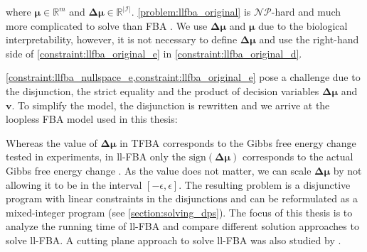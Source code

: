 where $\boldsymbol \mu \in \mathbb{R}^m$ and $\boldsymbol{\Delta \mu} \in \mathbb{R}^{|\mathcal{I}|}$. 
\cref{problem:llfba_original} is $\mathcal{NP}$-hard and much more complicated to solve than \textsf{FBA} \cite{cornelis_metabolic_nodate}. We use $\boldsymbol{\Delta \mu}$ and $\boldsymbol \mu$ due to the biological interpretability, however, it is not necessary to define $\boldsymbol{\Delta \mu}$ and use the right-hand side of \cref{constraint:llfba_original_e} in \cref{constraint:llfba_original_d}.

\newpage
\cref{constraint:llfba_nullspace_e,constraint:llfba_original_e} pose a challenge due to the disjunction, the strict equality and the product of decision variables $\boldsymbol{\Delta \mu}$ and $\mathbf v$. To simplify the model, the disjunction is rewritten and we arrive at the loopless FBA model used in this thesis:

 
\vspace*{-\baselineskip}

Whereas the value of $\boldsymbol{\Delta \mu}$ in \textsf{TFBA} corresponds to the Gibbs free energy change tested in experiments, in ll-FBA only the $\text{sign}(\boldsymbol{\Delta \mu})$ corresponds to the actual Gibbs free energy change \cite{elimination_infeasible_loops}. 
As the value does not matter, we can scale $\boldsymbol{\Delta \mu}$ by not allowing it to be in the interval $[- \epsilon, \epsilon ]$.
The resulting problem is a disjunctive program with linear constraints in the disjunctions and can be reformulated as a mixed-integer program (see \cref{section:solving_dps}). The focus of this thesis is to analyze the running time of \textsf{ll-FBA} and compare different solution approaches to solve \textsf{ll-FBA}. A cutting plane approach to solve \textsf{ll-FBA} was also studied by \cite{cornelis_metabolic_nodate}.

